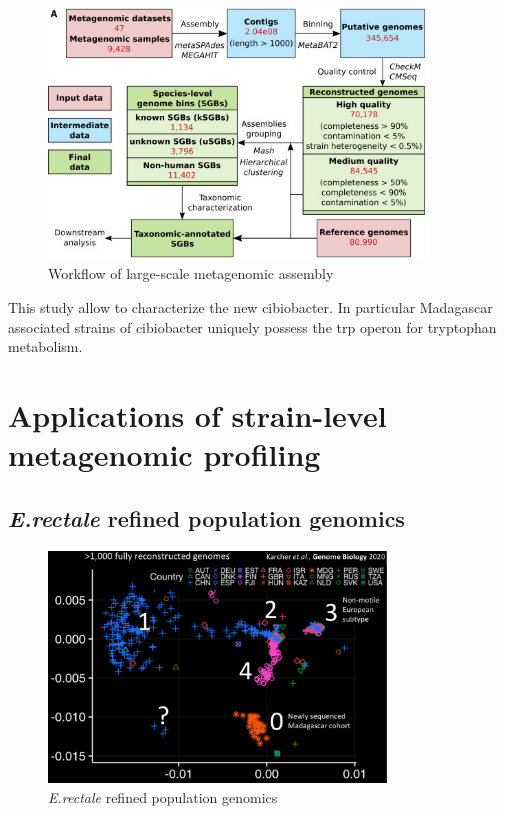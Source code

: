        \begin{figure}[h]
        \centering
        \includegraphics[width=0.9\textwidth]{workflow2.jpg}
        \caption{\label{fig:workflow2}Workflow of large-scale metagenomic assembly}
        \end{figure}

        This study allow to characterize the new cibiobacter.
        In particular Madagascar associated strains of cibiobacter uniquely possess the trp operon for tryptophan metabolism.

\section{Applications of strain-level metagenomic profiling}

    \subsection{\emph{E.rectale} refined population genomics}

    \begin{figure}[!h]
    \centering
    \includegraphics[width=0.8\textwidth]{Erec2.png}
    \caption{\label{fig:Erec2}\emph{E.rectale} refined population genomics}
    \end{figure}

